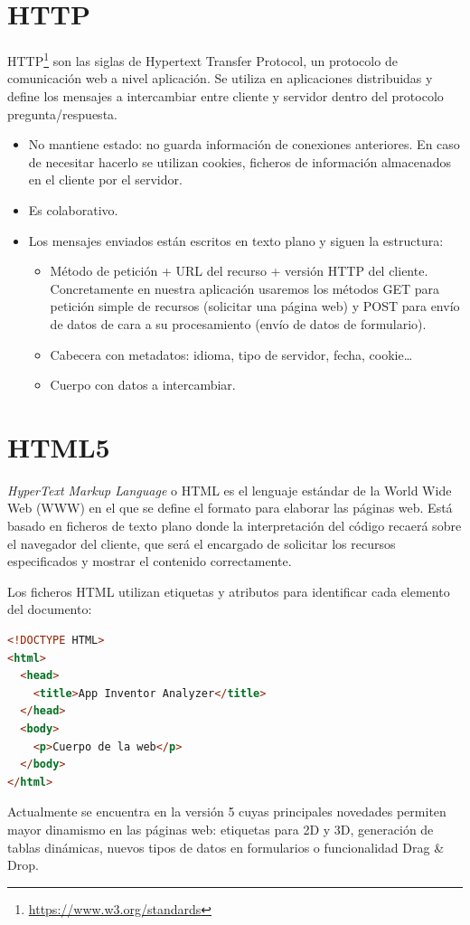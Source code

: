\documentclass[a4paper, 12pt]{book}
\begin{document}
\section{HTTP} 
\label{sec:seccion5}
HTTP\footnote{\url{https://www.w3.org/standards}} son las siglas de Hypertext Transfer Protocol, un protocolo de comunicación web a nivel aplicación. Se utiliza en aplicaciones distribuidas y define los mensajes a intercambiar entre cliente y servidor dentro del protocolo pregunta/respuesta.  
\begin{itemize}
	\item No mantiene estado: no guarda información de conexiones anteriores. En caso de necesitar hacerlo se utilizan cookies, ficheros de información almacenados en el cliente por el servidor. 
	\item Es colaborativo. 
	\item Los mensajes enviados están escritos en texto plano y siguen la estructura:
	\begin{itemize}
		\item Método de petición + URL del recurso + versión HTTP del cliente. Concretamente en nuestra aplicación usaremos los métodos GET para petición simple de recursos (solicitar una página web) y POST para envío de datos de cara a su procesamiento (envío de datos de formulario). 
		\item Cabecera con metadatos: idioma, tipo de servidor, fecha, cookie\ldots
		\item Cuerpo con datos a intercambiar.
	\end{itemize}	
\end{itemize}
\section{HTML5} 
\label{sec:seccion6}
\textit{HyperText Markup Language} o HTML es el lenguaje estándar de la World Wide Web (WWW) en el que se define el formato para elaborar las páginas web. Está basado en ficheros de texto plano donde la interpretación del código recaerá sobre el navegador del cliente, que será el encargado de solicitar los recursos especificados y mostrar el contenido correctamente. 

Los ficheros HTML utilizan etiquetas y atributos para identificar cada elemento del documento:
\begin{lstlisting}[language=HTML]
<!DOCTYPE HTML> 
<html>
  <head>
    <title>App Inventor Analyzer</title>
  </head>
  <body>
    <p>Cuerpo de la web</p>
  </body>
</html>
\end{lstlisting}
Actualmente se encuentra en la versión 5 cuyas principales novedades permiten mayor dinamismo en las páginas web: etiquetas para 2D y 3D, generación de tablas dinámicas, nuevos tipos de datos en formularios o funcionalidad Drag \& Drop. 
\end{document}
